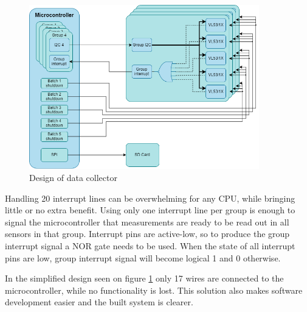 \begin{figure}[ht]
    \centering
    \includegraphics[width=100mm, keepaspectratio]{figures/data_collector.png}
    \caption{Design of data collector}
    \label{fig:data_collector}
\end{figure}

Handling 20 interrupt lines can be overwhelming for any CPU, while bringing little or no extra
benefit. Using only one interrupt line per group is enough to signal the microcontroller that 
measurements are ready to be read out in all sensors in that group. Interrupt pins are active-low,
so to produce the group interrupt signal a NOR gate needs to be used. When the state of all interrupt
pins are low, group interrupt signal will become logical 1 and 0 otherwise.

In the simplified design seen on figure \ref{fig:data_collector} only 17 wires are connected to
the microcontroller, while no functionality is lost. This solution also makes software development
easier and the built system is clearer.



